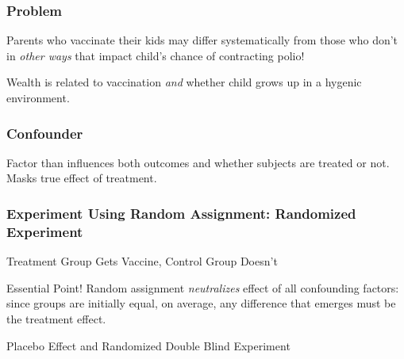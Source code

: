 \documentclass{beamer}
\begin{document}
\begin{frame}
\frametitle{Problem}
	Parents who vaccinate their kids may differ systematically from those who don't in \emph{other ways} that impact child's chance of contracting polio!
	
	\vspace{2em}
	\begin{alertblock}{Wealth is related to vaccination \emph{and} whether child grows up in a hygenic environment.}
	\end{alertblock}
\end{frame}
\begin{frame}
\frametitle{Confounder}

Factor than influences both outcomes and whether subjects are treated or not. Masks true effect of treatment.
\end{frame}


\begin{frame}

\frametitle{Experiment Using Random Assignment: Randomized Experiment}
Treatment Group Gets Vaccine, Control Group Doesn't

\begin{block}{Essential Point!}
Random assignment \emph{neutralizes} effect of all confounding factors: since groups are initially equal, on average, any difference that emerges must be the treatment effect.
\end{block}

\begin{block}{Placebo Effect and Randomized Double Blind Experiment}
\end{block}
\end{frame}
\end{document}
